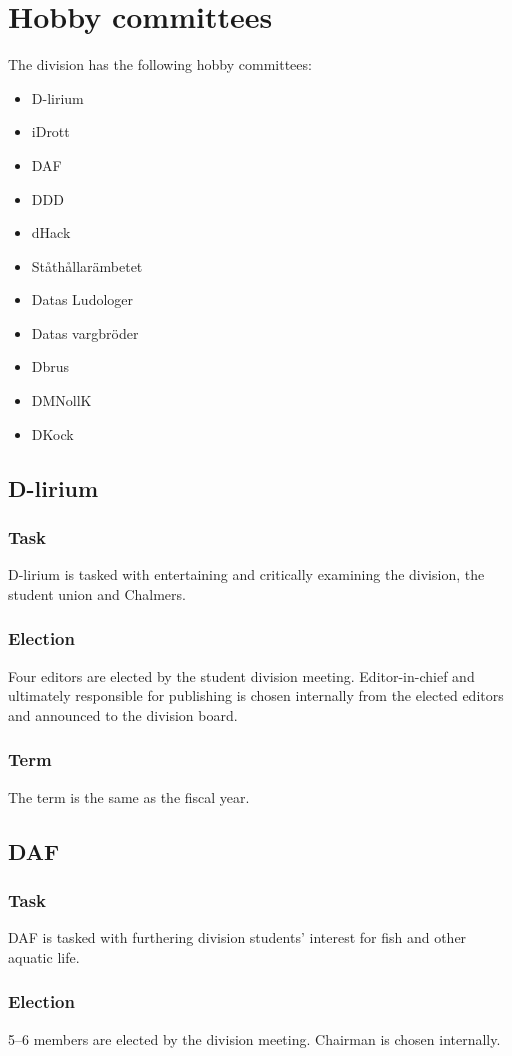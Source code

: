 \section{Hobby committees}
The division has the following hobby committees:
\begin{itemize}
  \item D-lirium 
  \item iDrott 
  \item DAF 
  \item DDD
  \item dHack
  \item Ståthållarämbetet
  \item Datas Ludologer 
  \item Datas vargbröder
  \item Dbrus
  \item DMNollK
  \item DKock
\end{itemize}

\subsection{D-lirium}
\subsubsection{Task}
D-lirium is tasked with entertaining and critically examining the division, the student union and Chalmers. 
\subsubsection{Election}
Four editors are elected by the student division meeting. Editor-in-chief and ultimately responsible for publishing is chosen internally from the elected editors and announced to the division board.
\subsubsection{Term}
The term is the same as the fiscal year. 

\subsection{DAF}
\subsubsection{Task}
DAF is tasked with furthering division students' interest for fish and other aquatic life. 
\subsubsection{Election}
5--6 members are elected by the division meeting. Chairman is chosen internally. 
